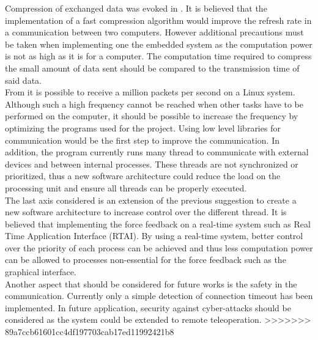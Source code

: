 Compression of exchanged data was evoked in . It is believed that the implementation of a fast compression algorithm would improve the refresh rate in a communication between two computers. However additional precautions must be taken when implementing one the embedded system as the computation power is not as high as it is for a computer. The computation time required to compress the small amount of data sent should be compared to the transmission time of said data.\\
From \cite{million_packets} it is possible to receive a million packets per second on a Linux system. Although such a high frequency cannot be reached when other tasks have to be performed on the computer, it should be possible to increase the frequency by optimizing the programs used for the project. Using low level libraries for communication would be the first step to improve the communication. In addition, the program currently runs many thread to communicate with external devices and between internal processes. These threads are not synchronized or prioritized, thus a new software architecture could reduce the load on the processing unit and ensure all threads can be properly executed.\\
The last axis considered is an extension of the previous suggestion to create a new software architecture to increase control over the different thread. It is believed that implementing the force feedback on a real-time system such as Real Time Application Interface (RTAI). By using a real-time system, better control over the priority of each process can be achieved and thus less computation power can be allowed to processes non-essential for the force feedback such as the graphical interface.\\
Another aspect that should be considered for future works is the safety in the communication. Currently only a simple detection of connection timeout has been implemented. In future application, security against cyber-attacks should be considered as the system could be extended to remote teleoperation.
>>>>>>> 89a7ccb61601cc4df197703cab17ed11992421b8
